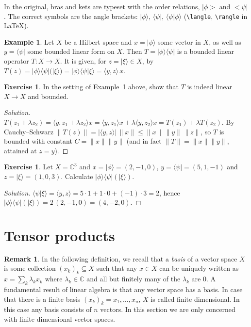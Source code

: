 \documentclass[11pt,a4paper]{article}
\numberwithin{equation}{section}
\newcommand{\C}{\mathbb{C}}
\newcommand{\ip}[2]{\langle #1, #2\rangle}
\newcommand{\ket}[1]{|#1\rangle}
\newcommand{\bra}[1]{\langle #1|}
\newcommand{\ketbra}[2]{|#1\rangle\langle #2|}
\theoremstyle{plain}
\theoremstyle{definition}
\newtheorem{example}[theorem]{Example}
\newtheorem{exercise}[theorem]{Exercise}
\newtheorem{remark}[theorem]{Remark}
\theoremstyle{plain}
\theoremstyle{definition}
\newenvironment{solution}{\begin{proof}[Solution]}{\end{proof}}
\begin{document}
\begin{correction}[(notation)]
In the original, bras and kets are typeset with the order relations, $|\phi>$ and
$<\psi|$. The correct symbols are the angle brackets: $\ket{\phi}$, $\bra{\psi}$,
$\langle\psi|\phi\rangle$ (\verb+\langle+, \verb+\rangle+ in \LaTeX).
\end{correction}

\begin{example}\label{ex:ketbra}
Let $X$ be a Hilbert space and $x=\ket{\phi}$ some vector in $X$, as well as $y=\bra{\psi}$
some bounded linear form on $X$. Then $T=\ketbra{\phi}{\psi}$ is a bounded linear operator
$T:X\to X$. It is given, for $z=\ket{\xi}\in X$, by
$T(z)=\ketbra{\phi}{\psi}(\ket{\xi})=\ket{\phi}\langle\psi|\xi\rangle=\ip{y}{z}\,x$.
\end{example}

\begin{exercise}
In the setting of Example~\ref{ex:ketbra} above, show that $T$ is indeed linear $X\to X$
and bounded.
\end{exercise}
\begin{solution}
$T(z_1+\lambda z_2)=\ip{y}{z_1+\lambda z_2}x=\ip{y}{z_1}x+\lambda\ip{y}{z_2}x
=T(z_1)+\lambda T(z_2)$. By Cauchy--Schwarz
$\|T(z)\|=|\ip{y}{z}|\,\|x\|\le\|x\|\,\|y\|\,\|z\|$, so $T$ is bounded with constant
$C=\|x\|\|y\|$ (and in fact $\|T\|=\|x\|\|y\|$, attained at $z=y$).
\end{solution}

\begin{exercise}
Let $X=\C^3$ and $x=\ket{\phi}=(2,-1,0)$, $y=\bra{\psi}=(5,1,-1)$ and $z=\ket{\xi}=(1,0,3)$.
Calculate $\ketbra{\phi}{\psi}(\ket{\xi})$.
\end{exercise}
\begin{solution}
$\langle\psi|\xi\rangle=\ip{y}{z}=5\cdot1+1\cdot0+(-1)\cdot3=2$, hence
$\ketbra{\phi}{\psi}(\ket\xi)=2\,(2,-1,0)=(4,-2,0)$.
\end{solution}
\section{Tensor products}

\begin{remark}
In the following definition, we recall that a \emph{basis} of a vector space $X$ is some
collection $(x_k)_k\subseteq X$ such that any $x\in X$ can be uniquely written as
$x=\sum_k\lambda_kx_k$ where $\lambda_k\in\C$ and all but finitely many of the $\lambda_k$
are $0$. A fundamental result of linear algebra is that any vector space has a basis. In
case that there is a finite basis $(x_k)_k=x_1,\dots,x_n$, $X$ is called finite
dimensional. In this case any basis consists of $n$ vectors. In this section we are only
concerned with finite dimensional vector spaces.
\end{remark}
\end{document}
